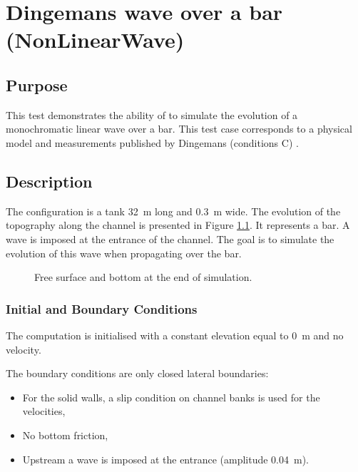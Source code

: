 \chapter{Dingemans wave over a bar (NonLinearWave)}

\section{Purpose}

This test demonstrates the ability of  to simulate the
evolution of a monochromatic linear wave over a bar.
This test case corresponds to a physical model and measurements
published by Dingemans (conditions C) \cite{Dingemans1994}.

\section{Description}

The configuration is a tank 32~m long and 0.3~m wide.
The evolution of the topography along the channel is presented in Figure
\ref{fig:nonlinear:bottom}. It represents a bar.
A wave is imposed at the entrance of the channel.
The goal is to simulate the evolution of this wave when propagating over
the bar.


\begin{figure}[H]
 \centering
{}
 \caption{Free surface and bottom at the end of simulation.}\label{fig:nonlinear:bottom}
\end{figure}

\subsection{Initial and Boundary Conditions}

The computation is initialised with a constant elevation equal to 0~m
and no velocity.

The boundary conditions are only closed lateral boundaries:
\begin{itemize}
\item For the solid walls, a slip condition on channel banks is used for the
velocities,
\item No bottom friction,
\item Upstream a wave is imposed at the entrance (amplitude 0.04~m).
\end{itemize}

